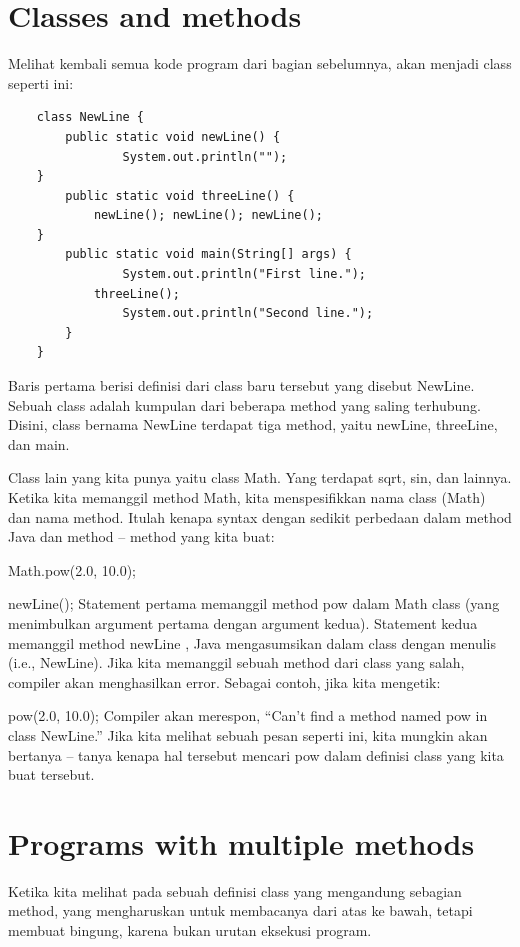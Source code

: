\section{Classes and methods}
Melihat kembali semua kode program dari bagian sebelumnya, akan menjadi class seperti ini: 
\begin{lstlisting}
	class NewLine {
		public static void newLine() {
				System.out.println("");
	}
		public static void threeLine() {
			newLine(); newLine(); newLine();
	}
		public static void main(String[] args) {
				System.out.println("First line.");
			threeLine();
				System.out.println("Second line.");
		}
	}
\end{lstlisting}
Baris pertama berisi definisi dari class baru tersebut yang disebut NewLine. Sebuah class adalah kumpulan dari beberapa method yang saling terhubung. Disini, class bernama NewLine terdapat tiga method, yaitu newLine, threeLine, dan main.

Class lain yang kita punya yaitu class Math. Yang terdapat sqrt, sin, dan lainnya. Ketika kita memanggil method Math, kita menspesifikkan nama class (Math) dan nama method. Itulah kenapa syntax dengan sedikit perbedaan dalam method Java dan method – method yang kita buat:\newline

	Math.pow(2.0, 10.0);
	
	newLine();\newline\newline
Statement pertama memanggil method pow dalam Math class (yang menimbulkan argument pertama dengan argument kedua). Statement kedua memanggil method newLine , Java mengasumsikan dalam class dengan menulis (i.e., NewLine). 
Jika kita memanggil sebuah method dari class yang salah, compiler akan menghasilkan error. Sebagai contoh, jika kita mengetik:\newline

	pow(2.0, 10.0);\newline\newline
Compiler akan merespon, “Can’t find a method named pow in class NewLine.” Jika kita melihat sebuah pesan seperti ini, kita mungkin akan bertanya – tanya  kenapa hal tersebut mencari pow dalam definisi class yang kita buat tersebut.

\section{Programs with multiple methods} 
Ketika kita melihat pada sebuah definisi class yang mengandung sebagian method, yang mengharuskan untuk membacanya dari atas ke bawah, tetapi membuat bingung, karena bukan urutan eksekusi program.

